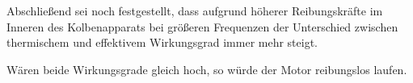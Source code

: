 Abschließend sei noch festgestellt, dass aufgrund höherer Reibungskräfte im Inneren des Kolbenapparats bei größeren Frequenzen der Unterschied zwischen thermischem und effektivem Wirkungsgrad immer mehr steigt.  

Wären beide Wirkungsgrade gleich hoch, so würde der Motor reibungslos laufen.  

